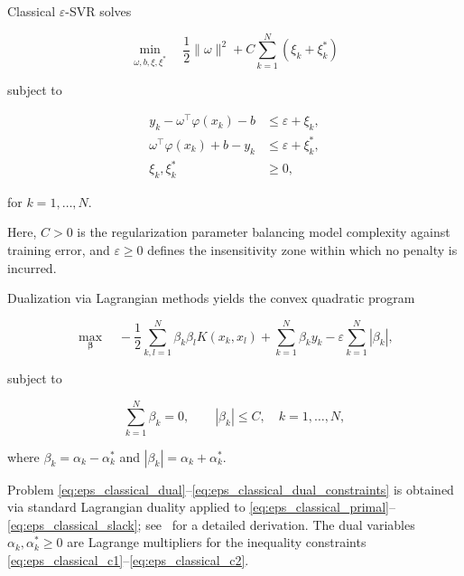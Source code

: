 \documentclass[mathematics,article,submit,pdftex,moreauthors]{Definitions/mdpi}
\begin{document}
Classical $\varepsilon$-SVR \cite{Vapnik1995,Smola2004} solves
\begin{linenomath}
\begin{equation}\label{eq:eps_classical_primal}
\min_{\omega,b,\xi,\xi^*}
\quad
\frac{1}{2}\|\omega\|^2
+ C \sum_{k=1}^N (\xi_k + \xi_k^*)
\end{equation}
\end{linenomath}
subject to
\begin{linenomath}
\begin{align}
y_k - \omega^\top\varphi(x_k) - b &\le \varepsilon + \xi_k, \label{eq:eps_classical_c1}\\
\omega^\top\varphi(x_k) + b - y_k &\le \varepsilon + \xi_k^*, \label{eq:eps_classical_c2}\\
\xi_k, \xi_k^* &\ge 0, \label{eq:eps_classical_slack}
\end{align}
\end{linenomath}
for $k=1,\ldots,N$.

Here, $C > 0$ is the regularization parameter balancing model complexity against training error, 
and $\varepsilon \geq 0$ defines the insensitivity zone within which no penalty is incurred.

Dualization via Lagrangian methods yields the convex quadratic program
\begin{linenomath}
\begin{equation}\label{eq:eps_classical_dual}
\max_{\boldsymbol{\beta}}
\quad
-\frac{1}{2}\sum_{k,l=1}^N \beta_k \beta_l K(x_k,x_l)
+\sum_{k=1}^N \beta_k y_k
-\varepsilon \sum_{k=1}^N |\beta_k|,
\end{equation}
\end{linenomath}
subject to
\begin{linenomath}
\begin{equation}\label{eq:eps_classical_dual_constraints}
\sum_{k=1}^N \beta_k = 0,
\qquad
|\beta_k| \le C, \quad k=1,\ldots,N,
\end{equation}
\end{linenomath}
where $\beta_k = \alpha_k - \alpha_k^*$ and $|\beta_k| = \alpha_k + \alpha_k^*$.

\begin{Remark}\label{rem:eps_classical_dual_derivation}
Problem \eqref{eq:eps_classical_dual}--\eqref{eq:eps_classical_dual_constraints}
is obtained via standard Lagrangian duality applied to
\eqref{eq:eps_classical_primal}--\eqref{eq:eps_classical_slack};
see~\cite{Smola2004} for a detailed derivation.
The dual variables $\alpha_k, \alpha_k^* \geq 0$ are Lagrange multipliers for the inequality constraints 
\eqref{eq:eps_classical_c1}--\eqref{eq:eps_classical_c2}.
\end{Remark}
\end{document}
